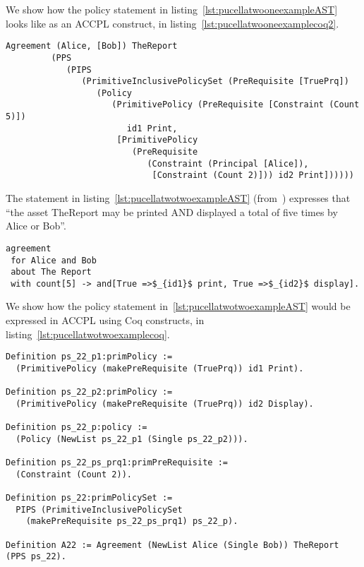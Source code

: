 We show how the policy statement in listing~\ref{lst:pucellatwooneexampleAST} looks like as an \ac{ACCPL} construct, in listing~\ref{lst:pucellatwooneexamplecoq2}.

\begin{minipage}[c]{0.95\textwidth}
\begin{lstlisting}
Agreement (Alice, [Bob]) TheReport
         (PPS
            (PIPS
               (PrimitiveInclusivePolicySet (PreRequisite [TruePrq])
                  (Policy
                     (PrimitivePolicy (PreRequisite [Constraint (Count 5)])
                        id1 Print,
                      [PrimitivePolicy
                         (PreRequisite
                            (Constraint (Principal [Alice]),
                             [Constraint (Count 2)])) id2 Print])))))

\end{lstlisting}
\end{minipage} 

The statement in listing~\ref{lst:pucellatwotwoexampleAST} (from~\cite{pucella2006}) expresses that ``the asset TheReport may be printed AND displayed a total of five times by Alice or Bob''.


\lstset{language=Pucella2006}
\begin{minipage}[c]{0.95\textwidth}
\begin{lstlisting}[frame=single, caption={Agreement of Example 2.2}, label={lst:pucellatwotwoexampleAST}, mathescape]
agreement
 for Alice and Bob 
 about The Report 
 with count[5] -> and[True =>$_{id1}$ print, True =>$_{id2}$ display].
\end{lstlisting}
\end{minipage} 

We show how the policy statement in~\ref{lst:pucellatwotwoexampleAST} would be expressed in \ac{ACCPL} using Coq constructs, in listing~\ref{lst:pucellatwotwoexamplecoq}.

\begin{minipage}[c]{0.95\textwidth}
\begin{lstlisting}
Definition ps_22_p1:primPolicy := 
  (PrimitivePolicy (makePreRequisite (TruePrq)) id1 Print).

Definition ps_22_p2:primPolicy := 
  (PrimitivePolicy (makePreRequisite (TruePrq)) id2 Display).

Definition ps_22_p:policy := 
  (Policy (NewList ps_22_p1 (Single ps_22_p2))).

Definition ps_22_ps_prq1:primPreRequisite := 
  (Constraint (Count 2)).

Definition ps_22:primPolicySet :=
  PIPS (PrimitiveInclusivePolicySet
    (makePreRequisite ps_22_ps_prq1) ps_22_p).

Definition A22 := Agreement (NewList Alice (Single Bob)) TheReport (PPS ps_22).
		
\end{lstlisting}
\end{minipage} 

